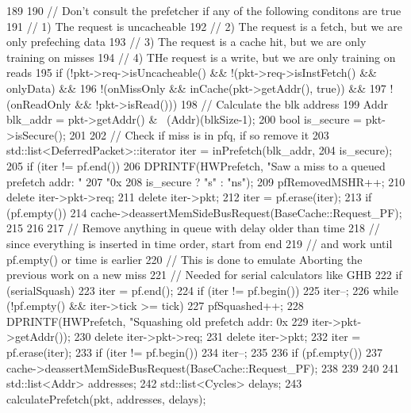 \begin{DoxyCode}
189 {
190     // Don't consult the prefetcher if any of the following conditons are true
191     // 1) The request is uncacheable
192     // 2) The request is a fetch, but we are only prefeching data
193     // 3) The request is a cache hit, but we are only training on misses
194     // 4) THe request is a write, but we are only training on reads
195     if (!pkt->req->isUncacheable() && !(pkt->req->isInstFetch() && onlyData) &&
196         !(onMissOnly && inCache(pkt->getAddr(), true)) &&
197         !(onReadOnly && !pkt->isRead())) {
198         // Calculate the blk address
199         Addr blk_addr = pkt->getAddr() & ~(Addr)(blkSize-1);
200         bool is_secure = pkt->isSecure();
201 
202         // Check if miss is in pfq, if so remove it
203         std::list<DeferredPacket>::iterator iter = inPrefetch(blk_addr,
204                                                               is_secure);
205         if (iter != pf.end()) {
206             DPRINTF(HWPrefetch, "Saw a miss to a queued prefetch addr: "
207                     "0x%
208                     is_secure ? "s" : "ns");
209             pfRemovedMSHR++;
210             delete iter->pkt->req;
211             delete iter->pkt;
212             iter = pf.erase(iter);
213             if (pf.empty())
214                 cache->deassertMemSideBusRequest(BaseCache::Request_PF);
215         }
216 
217         // Remove anything in queue with delay older than time
218         // since everything is inserted in time order, start from end
219         // and work until pf.empty() or time is earlier
220         // This is done to emulate Aborting the previous work on a new miss
221         // Needed for serial calculators like GHB
222         if (serialSquash) {
223             iter = pf.end();
224             if (iter != pf.begin())
225                 iter--;
226             while (!pf.empty() && iter->tick >= tick) {
227                 pfSquashed++;
228                 DPRINTF(HWPrefetch, "Squashing old prefetch addr: 0x%
229                         iter->pkt->getAddr());
230                 delete iter->pkt->req;
231                 delete iter->pkt;
232                 iter = pf.erase(iter);
233                 if (iter != pf.begin())
234                     iter--;
235             }
236             if (pf.empty())
237                 cache->deassertMemSideBusRequest(BaseCache::Request_PF);
238         }
239 
240 
241         std::list<Addr> addresses;
242         std::list<Cycles> delays;
243         calculatePrefetch(pkt, addresses, delays);
}}
\end{DoxyCode}
